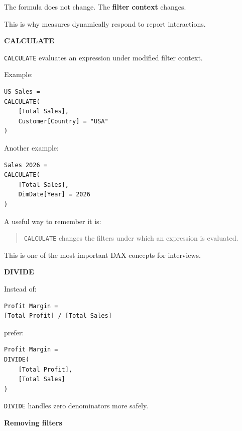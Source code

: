 \documentclass[11pt,letterpaper]{article}
\begin{document}
The formula does not change. The \textbf{filter context} changes.

This is why measures dynamically respond to report interactions.



\textbf{CALCULATE}

\texttt{CALCULATE} evaluates an expression under modified filter context.

Example:

\begin{lstlisting}
US Sales =
CALCULATE(
    [Total Sales],
    Customer[Country] = "USA"
)
\end{lstlisting}

Another example:

\begin{lstlisting}
Sales 2026 =
CALCULATE(
    [Total Sales],
    DimDate[Year] = 2026
)
\end{lstlisting}

A useful way to remember it is:

\begin{quote}
\texttt{CALCULATE} changes the filters under which an expression is evaluated.
\end{quote}

This is one of the most important DAX concepts for interviews.



\textbf{DIVIDE}

Instead of:

\begin{lstlisting}
Profit Margin =
[Total Profit] / [Total Sales]
\end{lstlisting}

prefer:

\begin{lstlisting}
Profit Margin =
DIVIDE(
    [Total Profit],
    [Total Sales]
)
\end{lstlisting}

\texttt{DIVIDE} handles zero denominators more safely.



\textbf{Removing filters}
\end{document}
